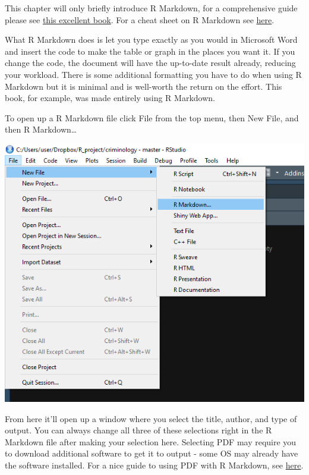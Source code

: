 \documentclass[
  12pt,
]{book}
\begin{document}
This chapter will only briefly introduce R Markdown, for a comprehensive guide please see \href{https://bookdown.org/yihui/rmarkdown/}{this excellent book}. For a cheat sheet on R Markdown see \href{https://www.rstudio.com/wp-content/uploads/2015/02/rmarkdown-cheatsheet.pdf}{here}.

What R Markdown does is let you type exactly as you would in Microsoft Word and insert the code to make the table or graph in the places you want it. If you change the code, the document will have the up-to-date result already, reducing your workload. There is some additional formatting you have to do when using R Markdown but it is minimal and is well-worth the return on the effort. This book, for example, was made entirely using R Markdown.

To open up a R Markdown file click File from the top menu, then New File, and then R Markdown\ldots{}

\includegraphics{images/markdown1.png}

From here it'll open up a window where you select the title, author, and type of output. You can always change all three of these selections right in the R Markdown file after making your selection here. Selecting PDF may require you to download additional software to get it to output - some OS may already have the software installed. For a nice guide to using PDF with R Markdown, see \href{https://medium.com/@sorenlind/create-pdf-.reports-using-r-r-markdown-latex-and-knitr-on-windows-10-952b0c48bfa9}{here}.
\end{document}
